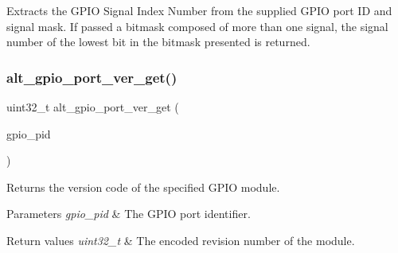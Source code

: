 Extracts the G\+P\+IO Signal Index Number from the supplied G\+P\+IO port ID and signal mask. If passed a bitmask composed of more than one signal, the signal number of the lowest bit in the bitmask presented is returned. \mbox{\label{group__ALT__GPIO__UTILITY_ga2a5551eef99ee5b725a4776dbc84097a}} 
\subsubsection{\texorpdfstring{alt\_gpio\_port\_ver\_get()}{alt\_gpio\_port\_ver\_get()}}
{\footnotesize\ttfamily uint32\+\_\+t alt\+\_\+gpio\+\_\+port\+\_\+ver\+\_\+get (\begin{DoxyParamCaption}\item[{\mbox{\hyperlink{group__ALT__GPIO__API__CONFIG_gaaf1cf0e2a720d20cd883810f2b59097e}{A\+L\+T\+\_\+\+G\+P\+I\+O\+\_\+\+P\+O\+R\+T\+\_\+t}}}]{gpio\+\_\+pid }\end{DoxyParamCaption})}

Returns the version code of the specified G\+P\+IO module.


\begin{DoxyParams}{Parameters}
{\em gpio\+\_\+pid} & The G\+P\+IO port identifier.\\
\hline
\end{DoxyParams}

\begin{DoxyRetVals}{Return values}
{\em uint32\+\_\+t} & The encoded revision number of the module. \\
\hline
\end{DoxyRetVals}
